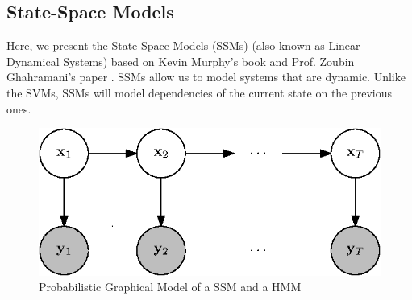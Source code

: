 \subsection{State-Space Models}

	Here, we present the State-Space Models (SSMs) (also known as Linear Dynamical Systems) based on Kevin Murphy's book \cite[Chapter 18]{mlBook} and Prof. Zoubin Ghahramani's paper \cite{ghahramani2000variational}. SSMs allow us to model systems that are dynamic. Unlike the SVMs, SSMs will model dependencies of the current state on the previous ones.
	
	\begin{figure}[h!]
		\centering
			\includegraphics{drawings/pgm.eps}
		\caption{Probabilistic Graphical Model of a SSM and a HMM}
		\label{fig:pgm}
	\end{figure}
	
